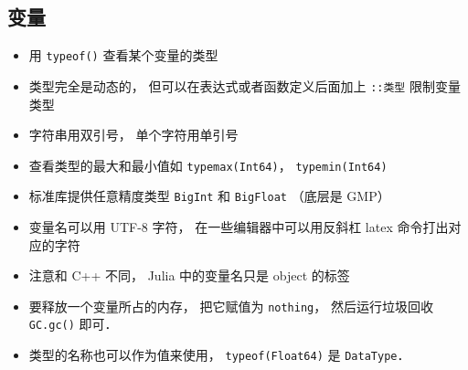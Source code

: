 \subsection{变量}
\begin{itemize}
\item 用 \verb|typeof()| 查看某个变量的类型
\item 类型完全是动态的， 但可以在表达式或者函数定义后面加上 \verb|::类型| 限制变量类型
\item 字符串用双引号， 单个字符用单引号
\item 查看类型的最大和最小值如 \verb|typemax(Int64)|， \verb|typemin(Int64)|
\item 标准库提供任意精度类型 \verb|BigInt| 和 \verb|BigFloat| （底层是 GMP）
\item 变量名可以用 UTF-8 字符， 在一些编辑器中可以用反斜杠 latex 命令打出对应的字符
\item 注意和 C++ 不同， Julia 中的变量名只是 object 的标签
\item 要释放一个变量所占的内存， 把它赋值为 \verb|nothing|， 然后运行垃圾回收 \verb|GC.gc()| 即可．
\item 类型的名称也可以作为值来使用， \verb|typeof(Float64)| 是 \verb|DataType|．
\end{itemize}

